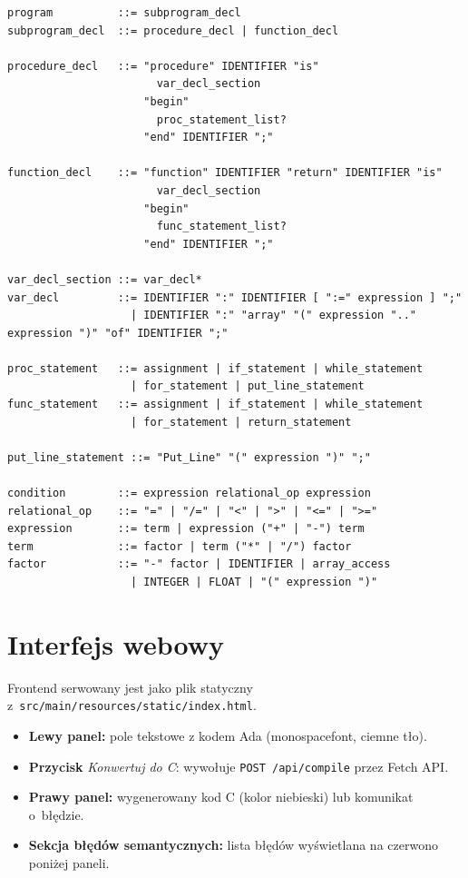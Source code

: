 \documentclass[12pt,a4paper]{article}
\begin{document}
\begin{lstlisting}[style=bnf, caption={Gramatyka (BNF -- skrót)}]
program          ::= subprogram_decl
subprogram_decl  ::= procedure_decl | function_decl

procedure_decl   ::= "procedure" IDENTIFIER "is"
                       var_decl_section
                     "begin"
                       proc_statement_list?
                     "end" IDENTIFIER ";"

function_decl    ::= "function" IDENTIFIER "return" IDENTIFIER "is"
                       var_decl_section
                     "begin"
                       func_statement_list?
                     "end" IDENTIFIER ";"

var_decl_section ::= var_decl*
var_decl         ::= IDENTIFIER ":" IDENTIFIER [ ":=" expression ] ";"
                   | IDENTIFIER ":" "array" "(" expression ".." expression ")" "of" IDENTIFIER ";"

proc_statement   ::= assignment | if_statement | while_statement
                   | for_statement | put_line_statement
func_statement   ::= assignment | if_statement | while_statement
                   | for_statement | return_statement

put_line_statement ::= "Put_Line" "(" expression ")" ";"

condition        ::= expression relational_op expression
relational_op    ::= "=" | "/=" | "<" | ">" | "<=" | ">="
expression       ::= term | expression ("+" | "-") term
term             ::= factor | term ("*" | "/") factor
factor           ::= "-" factor | IDENTIFIER | array_access
                   | INTEGER | FLOAT | "(" expression ")"
\end{lstlisting}

\section{Interfejs webowy}

Frontend serwowany jest jako plik statyczny z~\texttt{src/main/resources/static/index.html}.

\begin{itemize}
  \item \textbf{Lewy panel:} pole tekstowe z kodem Ada (monospacefont, ciemne tło).
  \item \textbf{Przycisk} \emph{Konwertuj do C}: wywołuje \texttt{POST /api/compile}
        przez Fetch API.
  \item \textbf{Prawy panel:} wygenerowany kod C (kolor niebieski) lub komunikat
        o~błędzie.
  \item \textbf{Sekcja błędów semantycznych:} lista błędów wyświetlana na czerwono
        poniżej paneli.
\end{itemize}
\end{document}
